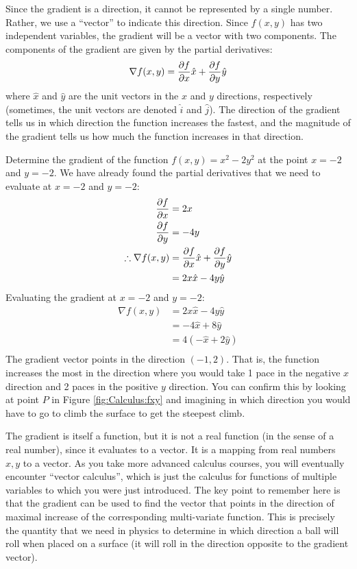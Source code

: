 Since the gradient is a direction, it cannot be represented by a single number. Rather, we use a ``vector'' to indicate this direction. Since $f(x,y)$ has two independent variables, the gradient will be a vector with two components. The components of the gradient are given by the partial derivatives:
\begin{align*}
\nabla f(x,y) = \frac{\partial f}{\partial x}\hat x+\frac{\partial f}{\partial y} \hat y
\end{align*}
where $\hat x$ and $\hat y$ are the unit vectors in the $x$ and $y$ directions, respectively (sometimes, the unit vectors are denoted $\hat i$ and $\hat j$). The direction of the gradient tells us in which direction the function increases the fastest, and the magnitude of the gradient tells us how much the function increases in that direction.

\begin{example}{Determine the gradient of the function $f(x,y)=x^2-2y^2$ at the point $x=-2$ and $y=-2$.}
We have already found the partial derivatives that we need to evaluate at $x=-2$ and $y=-2$:
\begin{align*}
\frac{\partial f}{\partial x}&= 2x\\
\frac{\partial f}{\partial y}&= -4y \\
\therefore \nabla f(x,y) &= \frac{\partial f}{\partial x}\hat x+\frac{\partial f}{\partial y} \hat y \\
&=2x\hat x-4y\hat y
\end{align*}
Evaluating the gradient at $x=-2$ and $y=-2$:
\begin{align*}
\nabla f(x,y) &= 2x\hat x-4y\hat y\\
&=-4 \hat x + 8 \hat y\\
&=4 (-\hat x+2\hat y)\\
\end{align*}
The gradient vector points in the direction $(-1,2)$. That is, the function increases the most in the direction where you would take 1 pace in the negative $x$ direction and 2 paces in the positive $y$ direction. You can confirm this by looking at point $P$ in Figure \ref{fig:Calculus:fxy} and imagining in which direction you would have to go to climb the surface to get the steepest climb.
\end{example}

The gradient is itself a function, but it is not a real function (in the sense of a real number), since it evaluates to a vector. It is a mapping from real numbers $x,y$ to a vector. As you take more advanced calculus courses, you will eventually encounter ``vector calculus'', which is just the calculus for functions of multiple variables to which you were just introduced. The key point to remember here is that the gradient can be used to find the vector that points in the direction of maximal increase of the corresponding multi-variate function. This is precisely the quantity that we need in physics to determine in which direction a ball will roll when placed on a surface (it will roll in the direction opposite to the gradient vector).

